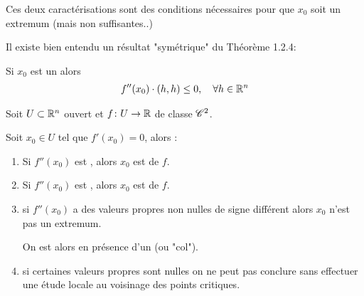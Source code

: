 \documentclass[french,a4paper,10pt]{article}
\begin{document}
	\begin{oc-remark}
		Ces deux caractérisations sont des conditions nécessaires pour que $x_0$ soit un extremum (mais non suffisantes..)
		
	\end{oc-remark}
	
	\begin{oc-remark}
		Il existe bien entendu un résultat "symétrique" du Théorème 1.2.4:
		\begin{no-num-theorem}
			Si $x_0$ est un  alors 
				\[\begin{aligned}
					f''(x_0)\cdot (h,h)\le 0,\quad\forall h\in\mathbb{R}^n
				\end{aligned}\]
			
		\end{no-num-theorem}
		
	\end{oc-remark}
	
	\begin{oc-theorem}
		Soit $U\subset \mathbb{R}^n$ ouvert et $f\colon U\to\mathbb{R}$ de classe $\mathscr{C}^2$.
		
		Soit $x_0\in U$ tel que $f'(x_0)=0$, alors :
		\begin{enumerate}[label=$(\roman*)$]
			\item Si $f''(x_0)$ est , alors $x_0$ est  de $f$.
			\item Si $f''(x_0)$ est , alors $x_0$ est  de $f$.
			\item si $f''(x_0)$ a des valeurs propres non nulles de signe différent alors $x_0$ n'est pas un extremum.
			
			On est alors en présence d'un  (ou "col").
			
			\item si certaines valeurs propres sont nulles on ne peut pas conclure sans effectuer une étude locale au voisinage des points critiques.
		\end{enumerate}
		
	\end{oc-theorem}
	
\end{document}
